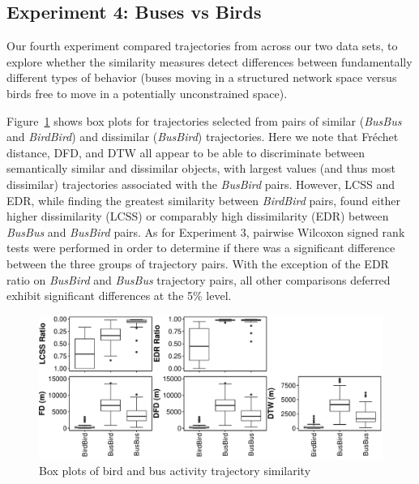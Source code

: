 \documentclass{interact}
\begin{document}
\subsection{Experiment 4: Buses vs Birds}
\label{par:result_4}
Our fourth experiment compared trajectories from across our two data sets, to explore whether the similarity measures detect differences between fundamentally different types of behavior (buses moving in a structured network space versus birds free to move in a potentially unconstrained space). %

Figure~\ref{fig:BusBird} shows box plots for trajectories selected from pairs of similar (\textit{BusBus} and \textit{BirdBird}) and dissimilar (\textit{BusBird}) trajectories. Here we note that Fréchet distance, DFD, and DTW all appear to be able to discriminate between semantically similar and dissimilar objects, with largest values (and thus most dissimilar) trajectories associated with the \textit{BusBird} pairs. However, LCSS and EDR, while finding the greatest similarity between \textit{BirdBird} pairs, found either higher dissimilarity (LCSS) or  comparably high dissimilarity (EDR) between \textit{BusBus} and \textit{BusBird} pairs. As for Experiment 3, pairwise Wilcoxon signed rank tests were performed in order to determine if there was a significant difference between the three groups of trajectory pairs. With the exception of the EDR ratio on \textit{BusBird} and \textit{BusBus} trajectory pairs, all other comparisons  deferred exhibit significant differences at the 5\% level.

\begin{figure}[h]
	\includegraphics[width=\linewidth]{figures/Exp4}
	\caption{Box plots of bird and bus activity trajectory similarity} \label{fig:BusBird}
\end{figure}
\end{document}
